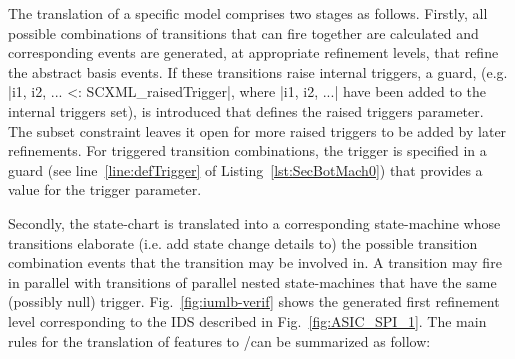 The translation of a specific \SCXML model comprises two stages as follows. 
Firstly, all possible combinations of transitions that can fire together are calculated and corresponding events are generated, at appropriate refinement levels, that refine the abstract basis events.  
If these transitions raise internal triggers, a guard, (e.g. |{i1, i2, ...} <: SCXML_raisedTrigger|, where |i1, i2, ...| have been added to the internal triggers set), is introduced that defines the raised triggers parameter. 
The subset constraint leaves it open for more raised triggers to be added by later refinements.
For triggered transition combinations, the trigger is specified in a guard (see line~\ref{line:defTrigger} of Listing~\ref{lst:SecBotMach0}) that provides a value for the trigger parameter. 


Secondly, the \SCXML state-chart is translated into a corresponding \UMLB state-machine whose transitions elaborate (i.e. add state change details to) the possible transition combination events that the transition may be involved in. 
A transition may fire in parallel with transitions of parallel nested state-machines that have the same (possibly null) trigger.
Fig.~\ref{fig:iumlb-verif} shows the generated \UMLB first refinement level corresponding to the IDS described in Fig.~\ref{fig:ASIC_SPI_1}. 
The main rules for the translation of \SCXML features to \UMLB/\EVENTB can be summarized as follow:

